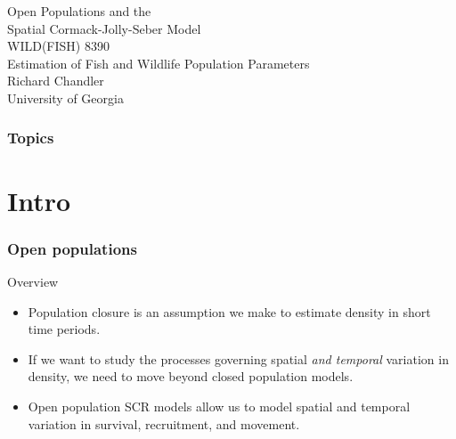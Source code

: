 \documentclass[color=usenames,dvipsnames]{beamer}\usepackage[]{graphicx}\usepackage[]{color}
\begin{document}
\begin{frame}[plain]
  \centering
  \LARGE
  Open Populations and the \\
  Spatial Cormack-Jolly-Seber Model \\
  \vfill
  \large
  WILD(FISH) 8390 \\
  Estimation of Fish and Wildlife Population Parameters \\
  \vfill
  Richard Chandler \\
  University of Georgia \\
\end{frame}







\begin{frame}[plain]
  \frametitle{Topics}
  \Large
\end{frame}




\section{Intro}





\begin{frame}
  \frametitle{Open populations}
  \large
  Overview
  \begin{itemize}[<+->]
    \normalsize
    \item Population closure is an assumption we make to estimate
      density in short time periods.
    \item If we want to study the processes governing spatial
      \textit{and temporal} variation in density, we need to move
      beyond closed population models.
    \item Open population SCR models allow us to model spatial and
      temporal variation in survival, recruitment, and movement.
  \end{itemize}
\end{frame}
\end{document}
